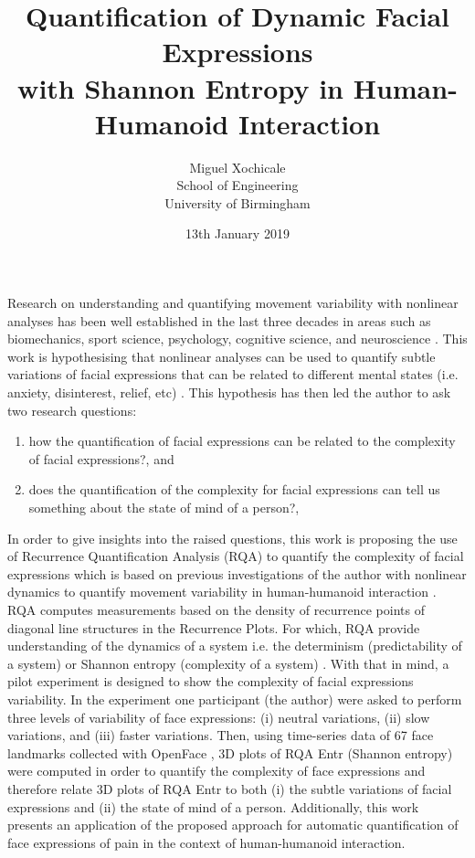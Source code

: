 \documentclass[12pt]{article}
\title{
Quantification of Dynamic Facial Expressions \\
with Shannon Entropy
in Human-Humanoid Interaction
}
\author{Miguel Xochicale \\
School of Engineering \\
University of Birmingham}
\date{13th January 2019}
\begin{document}
\maketitle
\thispagestyle{empty} %

Research on understanding and quantifying movement variability 
with nonlinear analyses has been well established in the last three 
decades in areas such as biomechanics, sport science, psychology, 
cognitive science, and neuroscience \cite{davids2003}.
This work is hypothesising that nonlinear analyses 
can be used to quantify subtle variations of facial expressions 
that can be related to different mental states 
(i.e. anxiety, disinterest, relief, etc) \cite{back2014}.
This hypothesis has then led the author to ask two research questions: 
\begin{enumerate}[label=(\roman*)]
\item how the quantification of facial expressions can be related to  
	the complexity of facial expressions?, and 
\item does the quantification of the complexity for facial expressions 
	can tell us something about the state of mind of a person?, 
\end{enumerate}


In order to give insights into the raised questions,
this work is proposing 
the use of Recurrence Quantification Analysis (RQA) 
to quantify the complexity of facial expressions 
which is based on previous investigations of the author 
with nonlinear dynamics to quantify movement variability 
in human-humanoid interaction \cite{XochicalePhDThesis2018}.
RQA computes measurements based on the density of 
recurrence points of diagonal line 
structures in the Recurrence Plots.
For which, RQA provide understanding of the dynamics of a system i.e. 
the determinism (predictability of a system) or 
Shannon entropy (complexity of a system) \cite{marwan2007}.
With that in mind, a pilot experiment is designed 
to show the complexity of facial expressions variability. 
In the experiment one participant (the author) 
were asked to perform 
three levels of variability of face expressions:
(i) neutral variations, (ii) slow variations, and (iii) faster variations.
Then, using time-series data of 67 face landmarks collected 
with OpenFace \cite{baltrusaitis2018}, 3D plots
of RQA Entr (Shannon entropy) were computed in order
to quantify the complexity of face expressions and 
therefore relate 3D plots of RQA Entr 
to both (i) the subtle variations of facial expressions 
and (ii) the state of mind of a person. Additionally,
this work presents an application of the proposed approach
for automatic quantification of face expressions of pain
in the context of human-humanoid interaction.




\end{document}
